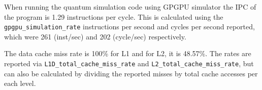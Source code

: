 \documentclass{article}
\begin{document}


When running the quantum simulation code using GPGPU simulator the IPC of the program is 1.29 instructions per cycle. This is calculated using the \verb|gpgpu_simulation_rate| instructions per second and cycles per second reported, which were 261 (inst/sec) and 202 (cycle/sec) respectively.

The data cache miss rate is 100\% for L1 and for L2, it is 48.57\%. The rates are reported via \verb|L1D_total_cache_miss_rate| and \verb|L2_total_cache_miss_rate|, but can also be calculated by dividing the reported misses by total cache accesses per each level.
\end{document}
